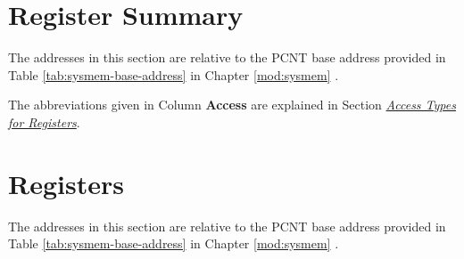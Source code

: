 \documentclass[main\_\_EN.tex]{subfiles}
\begin{document}



\newpage
\hypertarget{pcnt-reg-summ}{}
\section{Register Summary}
\label{sec:pcnt-reg-summ}

The addresses in this section are relative to the PCNT base address provided in Table \ref{tab:sysmem-base-address} \textit{} in Chapter \ref{mod:sysmem} \textit{}.

The abbreviations given in Column \textbf{Access} are explained in Section \hyperref[glossary-access-types]{\textit{Access Types for Registers}}.






\newpage
\section{Registers}

The addresses in this section are relative to the PCNT base address provided in Table \ref{tab:sysmem-base-address} \textit{} in Chapter \ref{mod:sysmem} \textit{}.



\end{document}
